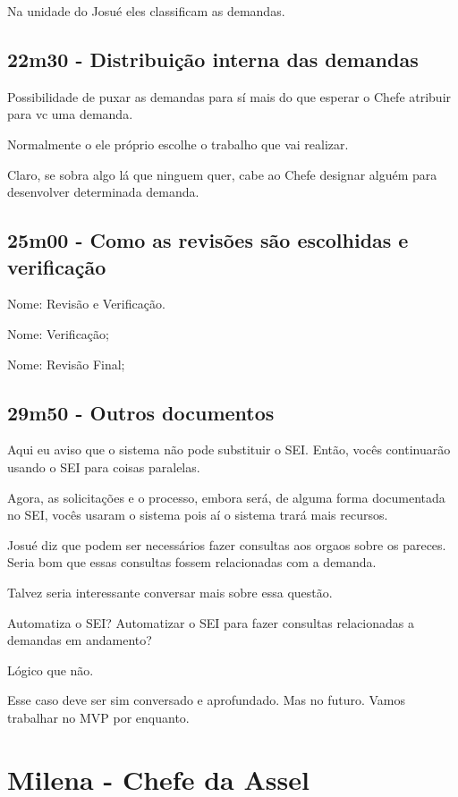 Na unidade do Josué eles classificam as demandas.

 
\subsection{22m30 - Distribuição interna das demandas}

Possibilidade de puxar as demandas para sí mais do que esperar o Chefe atribuir para vc uma demanda.

Normalmente o \CL ele próprio escolhe o trabalho que vai realizar.

Claro, se sobra algo lá que ninguem quer, cabe ao Chefe designar alguém para desenvolver determinada demanda.

\subsection{25m00 - Como as revisões são escolhidas e verificação}

Nome: Revisão e Verificação.

Nome: Verificação;

Nome: Revisão Final;

\subsection{29m50 - Outros documentos}

Aqui eu aviso que o sistema não pode substituir o SEI. Então, vocês continuarão usando o SEI para coisas paralelas.

Agora, as solicitações e o processo, embora será, de alguma forma documentada no SEI, vocês usaram o sistema pois aí o sistema trará mais recursos. 

Josué diz que podem ser necessários fazer consultas aos orgaos sobre os pareces. Seria bom que essas consultas fossem relacionadas com a demanda.

Talvez seria interessante conversar mais sobre essa questão.

\begin{importante}{Automatiza o SEI?}
 Automatizar o SEI para fazer consultas relacionadas a demandas em andamento?	
 
 Lógico que não.
 
 Esse caso deve ser sim conversado e aprofundado. Mas no futuro. Vamos trabalhar no MVP por enquanto. 
\end{importante}

\section{Milena - Chefe da Assel}

